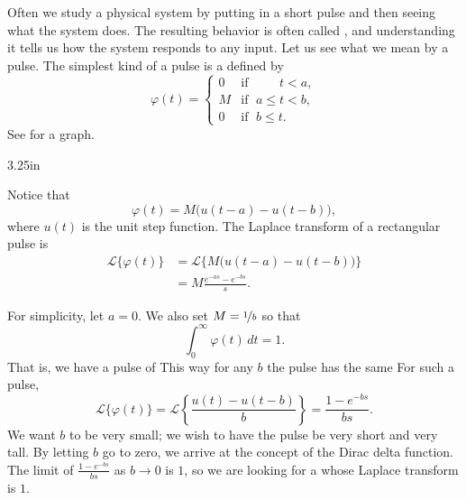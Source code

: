 Often we study a physical system by putting in a short pulse 
and then seeing what the system does.
The resulting behavior is
often called \emph{},
and understanding it tells us how the system responds to any input.
Let us see what we mean by a pulse.
The simplest kind of a pulse is a
\emph{}
defined by
\begin{equation*}
\varphi(t) = 
\begin{cases}
0 & \text{if } \; \phantom{a \leq {}} t < a , \\
M & \text{if } \; a \leq t < b , \\
0 & \text{if } \; b \leq t .
\end{cases}
\end{equation*}
See  for a graph.

\begin{mywrapfig}[14]{3.25in}
\capstart
{}
\caption{Sample rectangular pulse with $a=0.5$, $b=1$, and $M = 2$.\label{lt:sqpulse}}
\end{mywrapfig}

Notice that
\begin{equation*}
\varphi(t) = M \bigl( u(t-a) - u(t-b) \bigr) ,
\end{equation*}
where $u(t)$ is the unit step function.
The Laplace transform of a rectangular pulse is
\begin{equation*}
\begin{split}
{\mathcal{L}} \bigl\{ \varphi(t) \bigr\}
& =
{\mathcal{L}} \bigl\{ M \bigl( u(t-a) - u(t-b) \bigr)  \bigr\}
\\
& =
M
\frac{e^{-as} - e^{-bs}}{s} .
\end{split}
\end{equation*}

For simplicity, let $a=0$.
We also
set $M = \nicefrac{1}{b}$ so that
\begin{equation*}
\int_0^\infty \varphi(t) \,dt = 1 .
\end{equation*}
That is, we have a pulse of 
This way for any $b$ the pulse has the same 
For such a pulse,
\begin{equation*}
{\mathcal{L}} \bigl\{ \varphi(t) \bigr\}
=
{\mathcal{L}} \left\{ \frac{u(t) - u(t-b)}{b}  \right\}
=
\frac{1 - e^{-bs}}{bs} .
\end{equation*}
We want $b$ to be very small; we wish to have
the pulse be very short and very tall.  By letting $b$ go to zero, we arrive
at the concept of the Dirac delta function.  The limit
of $\frac{1-e^{-bs}}{bs}$
as $b \to 0$ is $1$, so we are looking for a  whose Laplace
transform is $1$.


